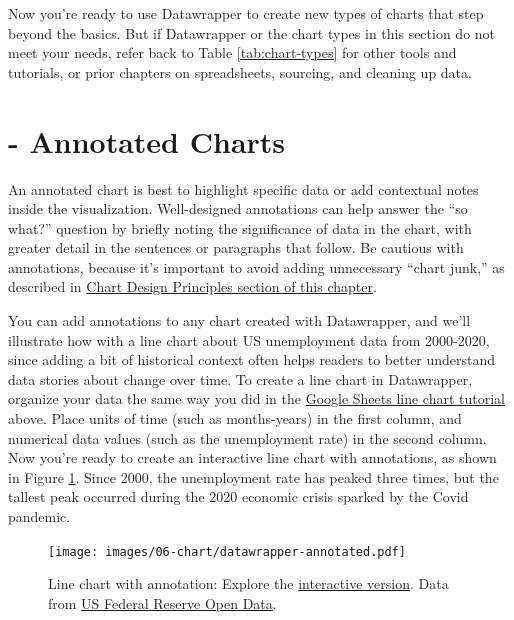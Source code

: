 \documentclass[
  english,
]{book}
\begin{document}
Now you're ready to use Datawrapper to create new types of charts that step beyond the basics. But if Datawrapper or the chart types in this section do not meet your needs, refer back to Table \ref{tab:chart-types} for other tools and tutorials, or prior chapters on spreadsheets, sourcing, and cleaning up data.

\hypertarget{annotated-datawrapper}{%
\section*{- Annotated Charts}\label{annotated-datawrapper}}

An annotated chart is best to highlight specific data or add contextual notes inside the visualization. Well-designed annotations can help answer the ``so what?'' question by briefly noting the significance of data in the chart, with greater detail in the sentences or paragraphs that follow. Be cautious with annotations, because it's important to avoid adding unnecessary ``chart junk,'' as described in \href{chart-design.html}{Chart Design Principles section of this chapter}.

You can add annotations to any chart created with Datawrapper, and we'll illustrate how with a line chart about US unemployment data from 2000-2020, since adding a bit of historical context often helps readers to better understand data stories about change over time. To create a line chart in Datawrapper, organize your data the same way you did in the \href{pie-line-area-google.html}{Google Sheets line chart tutorial} above. Place units of time (such as months-years) in the first column, and numerical data values (such as the unemployment rate) in the second column. Now you're ready to create an interactive line chart with annotations, as shown in Figure \ref{fig:datawrapper-annotated}. Since 2000, the unemployment rate has peaked three times, but the tallest peak occurred during the 2020 economic crisis sparked by the Covid pandemic.



\begin{figure}
\centering
\texttt{[image: images/06-chart/datawrapper-annotated.pdf]}
\caption{\label{fig:datawrapper-annotated}Line chart with annotation: Explore the \href{https://datawrapper.dwcdn.net/vHuob/}{interactive version}. Data from \href{https://docs.google.com/spreadsheets/d/1mjUu4OfMjWfFP-miPiObi6vXzJUIMi1TSuoaT61FU6U/edit\#gid=821851972}{US Federal Reserve Open Data}.}
\end{figure}
\end{document}
